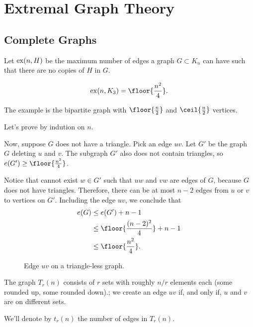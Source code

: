 \newpage
\section{Extremal Graph Theory}
\subsection{Complete Graphs}

\begin{defn}
	Let $\operatorname{ex}(n, H)$ be the maximum number of edges a graph  $G \subset K_n$ can have such that there are no copies of $H$ in $G$.
\end{defn}

\begin{thm}[Mantel, 1907]
	\[
		\ex(n, K_3) = \floor{\frac{n^2}{4}}.
	\]
\end{thm}

\begin{dem}
	The example is the bipartite graph with $\floor{\frac{n}{2}}$ and $\ceil{\frac{n}{2}}$ vertices.

	Let's prove by indution on $n$.

	Now, suppose $G$ does not have a triangle.
	Pick an edge $uv$. Let $G'$ be the graph $G$ deleting $u$ and $v$. The subgraph $G'$ also does not contain triangles, so $e(G') \ge \floor{\frac{n^2}{4}}$.

	Notice that cannot exist $w \in G'$ such that $uw$ and $vw$ are edges of $G$, because $G$ does not have triangles. Therefore, there can be at most $n-2$ edges from $u$ or $v$ to vertices on $G'$. Including the edge $uv$, we conclude that
	\begin{align*}
		e(G) &\le e(G') + n - 1\\
			 &\le \floor{\frac{(n-2)^2}{4}} + n - 1\\
			 &\le \floor{\frac{n^2}{4}}.
	\end{align*}
\end{dem}

\begin{figure}[ht]
    \centering
    \caption{Edge $uv$ on a triangle-less graph.}
    \label{fig:edge-uv-on-a-triangle-less-graph}
\end{figure}

\begin{defn}
	The graph $T_r(n)$ consists of $r$ sets with roughly $n/r$ elements each (some rounded up, some rounded down).; we create an edge $uv$ if, and only if, $u$ and $v$ are on different sets.

	We'll denote by $t_r(n)$ the number of edges in $T_r(n)$.
\end{defn}

